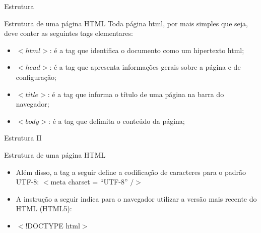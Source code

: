 \documentclass{beamer}
\begin{document}
\begin{frame}{Estrutura}
  \begin{block}{Estrutura de uma página HTML}
    Toda página html, por mais simples que seja, deve conter as seguintes tags 
elementares:
    \begin{itemize}
     \item $<html>$: é a tag que identifica o documento como um hipertexto html;
     \item $<head>$: é a tag que apresenta informações gerais sobre a 
página e de configuração;
     \item $<title>$: é a tag que informa o título de uma página na barra 
do navegador;
     \item $<body>$: é a tag que delimita o conteúdo da página;
  \end{itemize}
  \end{block}
\end{frame}
\begin{frame}{Estrutura II}
  \begin{block}{Estrutura de uma página HTML}
   \begin{itemize}
    \item Além disso, a tag a seguir define a codificação de caracteres 
para o padrão UTF-8: $<$meta charset = “UTF-8” $/>$ \\
   \item A instrução a seguir indica para o navegador utilizar a versão 
mais recente do HTML (HTML5):
  \item $<$!DOCTYPE html$>$
  \end{itemize}
  \end{block}
\end{frame}
\end{document}
